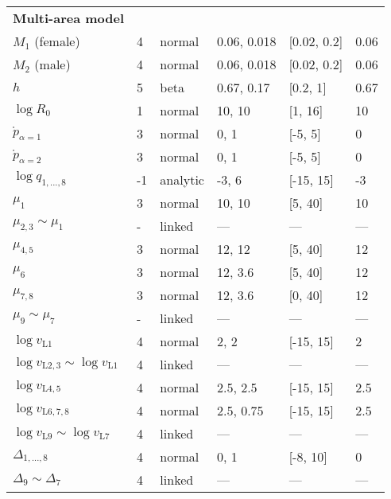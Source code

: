 \documentclass[11pt]{book}
\begin{document}
\begin{longtable}{L{1.3in}C{0.8in}C{1.0in}C{1.4in}C{0.9in}C{1.0in}}
\textbf{Multi-area model}      &    &           &                   &             &\\
$M_{1}$ (female)               &  4 & normal    & 0.06, 0.018       & [0.02, 0.2] &  0.06\\
$M_{2}$ (male)                 &  4 & normal    & 0.06, 0.018       & [0.02, 0.2] &  0.06\\
$h$                            &  5 & beta      & 0.67, 0.17        & [0.2, 1]    &  0.67\\
$\log R_0$                     &  1 & normal    & 10, 10            & [1, 16]     &  10\\
$\mathring{p}_{\alpha=1}$       &  3 & normal    & 0, 1              & [-5, 5]     &  0\\
$\mathring{p}_{\alpha=2}$       &  3 & normal    & 0, 1              & [-5, 5]     &  0\\
$\log q_{1,...,8}$             & -1 & analytic  & -3,   6           & [-15, 15]   & -3\\
$\mu_{1}$                      &  3 & normal    & 10, 10            & [5, 40]     & 10\\
$\mu_{2,3} \sim \mu_{1}$       &  - & linked    & ---               & ---         & ---\\
$\mu_{4,5}$                    &  3 & normal    & 12, 12            & [5, 40]     & 12\\
$\mu_{6}$                      &  3 & normal    & 12, 3.6           & [5, 40]     & 12\\
$\mu_{7,8}$                    &  3 & normal    & 12, 3.6           & [0, 40]     & 12\\
$\mu_{9} \sim \mu_{7}$         &  - & linked    & ---               & ---         & ---\\
$\log v_{\text{L}1}$           &  4 & normal    & 2, 2              & [-15, 15]   & 2\\
$\log v_{\text{L}2,3} \sim \log v_{\text{L}1}$ & 4 & linked        & ---  & ---  & ---\\
$\log v_{\text{L}4,5}$         &  4 & normal    & 2.5, 2.5          & [-15, 15]   & 2.5\\
$\log v_{\text{L}6,7,8}$       &  4 & normal    & 2.5, 0.75         & [-15, 15]   & 2.5\\
$\log v_{\text{L}9} \sim \log v_{\text{L}7}$   & 4 & linked        & ---  & ---  & ---\\
$\Delta_{1,...,8}$             &  4 & normal    & 0, 1              & [-8, 10]    & 0\\
$\Delta_{9} \sim \Delta_{7}$   &  4 & linked    & ---               & ---         & ---\\
\hline  
\end{longtable}
\end{document}
